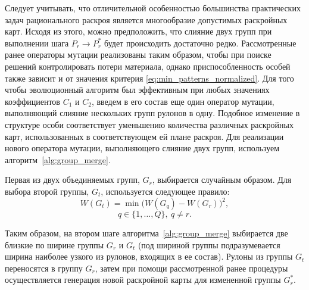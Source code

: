 \documentclass[12pt]{article}
\begin{document}
Следует учитывать, что отличительной особенностью большинства практических 
задач рационального раскроя является многообразие допустимых раскройных карт. 
Исходя из этого, можно предположить, что слияние двух групп при выполнении 
шага $P_r \rightarrow P_r^*$ будет происходить достаточно редко. Рассмотренные 
ранее операторы мутации реализованы таким образом, чтобы при поиске решений 
контролировать потери материала, однако приспособленность особей также зависит 
и от значения критерия 
\eqref{eq:min_patterns_normalized}. 
Для того чтобы эволюционный алгоритм был 
эффективным при любых значениях коэффициентов $C_1$ и $C_2$, введем в его 
состав еще один оператор мутации, выполняющий слияние нескольких групп рулонов 
в одну. Подобное изменение в структуре особи соответствует уменьшению 
количества различных раскройных карт, использованных в соответствующем ей 
плане раскроя. Для реализации нового оператора мутации, выполняющего слияние 
двух групп, используем алгоритм~\ref{alg:group_merge}.

Первая из двух объединяемых групп, $G_r$, выбирается случайным образом. 
Для выбора второй группы, $G_t$, используется следующее правило:
\[ W(G_t)=\min{\bigl( W(G_q) - W(G_r) \bigr)^2}, \]
\[ q \in \{1,\ldots,Q\}, \: q \neq r. \]

Таким образом, на втором шаге алгоритма~\ref{alg:group_merge}
выбирается две близкие по ширине группы $G_r$ и 
$G_t$ (под шириной группы подразумевается ширина наиболее узкого из рулонов, 
входящих в ее состав). Рулоны из группы $G_t$ переносятся в группу $G_r$, 
затем при помощи рассмотренной ранее процедуры осуществляется генерация новой 
раскройной карты для измененной группы $G_r^*$.
\end{document}
